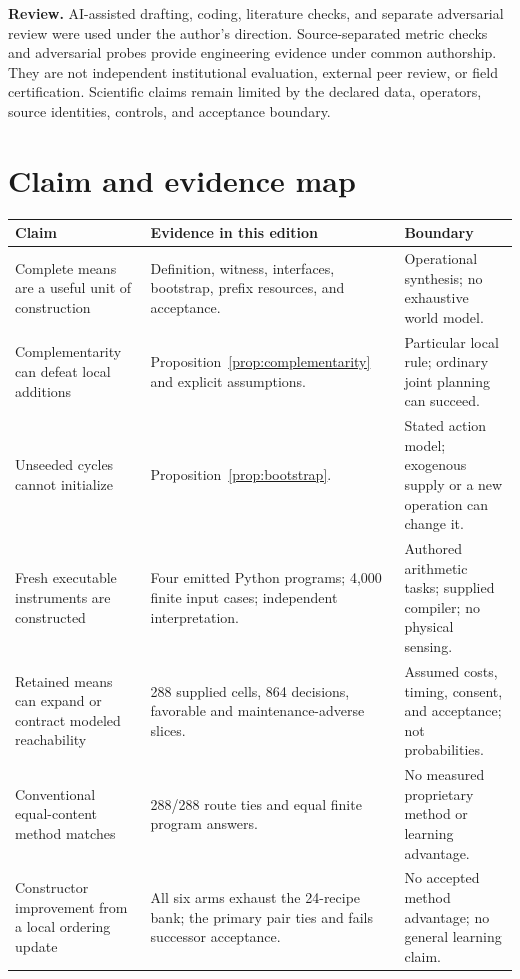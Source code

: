 \textbf{Review.} AI-assisted drafting, coding, literature checks, and separate adversarial review were used under the author's direction. Source-separated metric checks and adversarial probes provide engineering evidence under common authorship. They are not independent institutional evaluation, external peer review, or field certification. Scientific claims remain limited by the declared data, operators, source identities, controls, and acceptance boundary.

\section{Claim and evidence map}
\label{app:claims}

\begingroup\small
\begin{longtable}{@{}P{1.53in}P{2.51in}P{2.43in}@{}}
\toprule
\textbf{Claim} & \textbf{Evidence in this edition} & \textbf{Boundary}\\
\midrule
\endhead
Complete means are a useful unit of construction & Definition, witness, interfaces, bootstrap, prefix resources, and acceptance. & Operational synthesis; no exhaustive world model.\\[.35em]
Complementarity can defeat local additions & Proposition~\ref{prop:complementarity} and explicit assumptions. & Particular local rule; ordinary joint planning can succeed.\\[.35em]
Unseeded cycles cannot initialize & Proposition~\ref{prop:bootstrap}. & Stated action model; exogenous supply or a new operation can change it.\\[.35em]
Fresh executable instruments are constructed & Four emitted Python programs; 4,000 finite input cases; independent interpretation. & Authored arithmetic tasks; supplied compiler; no physical sensing.\\[.35em]
Retained means can expand or contract modeled reachability & 288 supplied cells, 864 decisions, favorable and maintenance-adverse slices. & Assumed costs, timing, consent, and acceptance; not probabilities.\\[.35em]
Conventional equal-content method matches & 288/288 route ties and equal finite program answers. & No measured proprietary method or learning advantage.\\[.35em]
Constructor improvement from a local ordering update & All six arms exhaust the 24-recipe bank; the primary pair ties and fails successor acceptance. & No accepted method advantage; no general learning claim.\\[.35em]

\end{longtable}
